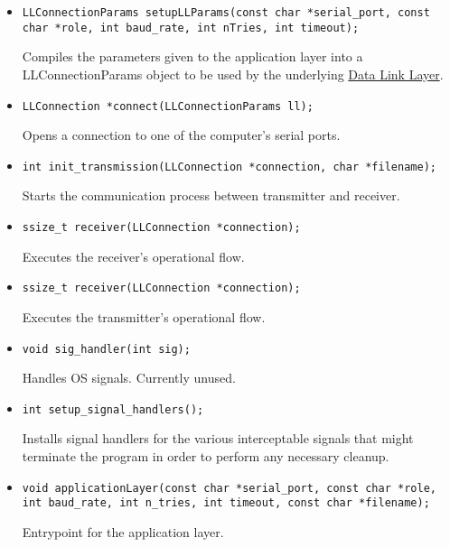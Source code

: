 \documentclass[11pt,a4paper]{article}
\begin{document}
\begin{itemize}
    \item \begin{lstlisting}
LLConnectionParams setupLLParams(const char *serial_port, const char *role, int baud_rate, int nTries, int timeout);
    \end{lstlisting}

    Compiles the parameters given to the application layer into a LLConnectionParams object to be used by the underlying \hyperref[sec:dll]{Data Link Layer}.

    \item \begin{lstlisting}
LLConnection *connect(LLConnectionParams ll);
    \end{lstlisting}

    Opens a connection to one of the computer's serial ports.

    \item \begin{lstlisting}
int init_transmission(LLConnection *connection, char *filename);
    \end{lstlisting}

    Starts the communication process between transmitter and receiver.

    \item \begin{lstlisting}
ssize_t receiver(LLConnection *connection);
    \end{lstlisting}

    Executes the receiver's operational flow.

    \item \begin{lstlisting}
ssize_t receiver(LLConnection *connection);
    \end{lstlisting}
        
    Executes the transmitter's operational flow.

    \item \begin{lstlisting}
void sig_handler(int sig);
    \end{lstlisting}

    Handles OS signals. Currently unused.

    \item \begin{lstlisting}
int setup_signal_handlers();
    \end{lstlisting}

    Installs signal handlers for the various interceptable signals that might terminate the program in order to perform any necessary cleanup.

    \item \begin{lstlisting}
void applicationLayer(const char *serial_port, const char *role, int baud_rate, int n_tries, int timeout, const char *filename);
    \end{lstlisting}

    Entrypoint for the application layer.

\end{itemize}
\end{document}
